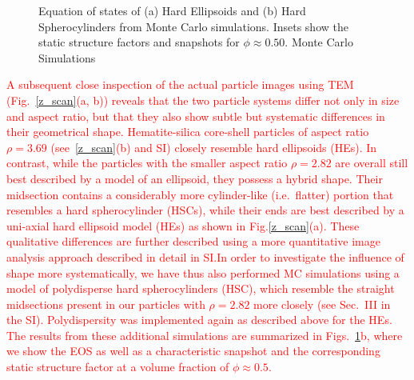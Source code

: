 \documentclass[aps,prl,preprint,superscriptaddress]{revtex4-1} %
\begin{document}
\begin{figure}[h]
\caption{Equation of states of (a) Hard Ellipsoids and (b) Hard Spherocylinders from Monte Carlo simulations. 
  Insets show the static structure factors and snapshots for $\phi\approx 0.50$. 
Monte Carlo Simulations}\label{fig:sim}
\end{figure}



\textcolor{red}{A subsequent close inspection of the actual particle images using TEM (Fig.~\ref{z_scan}(a, b)) reveals
  that the two particle systems differ not only in size and aspect ratio, but that they also show subtle but systematic
  differences in their geometrical shape. Hematite-silica core-shell particles of aspect ratio $\rho=3.69$ 
  (see~\ref{z_scan}(b) and SI) closely resemble hard ellipsoids (HEs). In contrast, while the particles with the smaller
  aspect ratio $\rho=2.82$ are overall still best described by a model of an ellipsoid, they possess a    hybrid shape.
  Their midsection contains a considerably more cylinder-like (i.e.~flatter) portion that resembles a hard
  spherocylinder (HSCs),  while their ends are best described by a uni-axial hard ellipsoid model (HEs) as shown in
  Fig.\ref{z_scan}(a). These qualitative differences are further described using a more quantitative image analysis
  approach described in detail in SI.\@ In order to investigate the influence of shape more systematically, we have thus
  also performed MC simulations using a model of polydisperse hard spherocylinders (HSC), which resemble the straight
  midsections present in our particles with $\rho=2.82$ more closely ({\color{green}see Sec.~III }in the SI). Polydispersity was implemented again as
  described above for the HEs. The results from these additional simulations are summarized in Figs.~\ref{fig:sim}b,
  where we show the EOS as well as a characteristic snapshot and the corresponding static structure factor at a volume
fraction of $\phi \approx 0.5$.}
\end{document}
